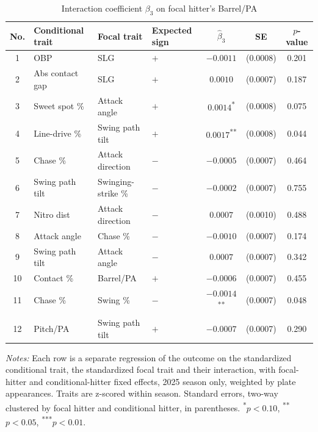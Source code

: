 \begin{table}[htbp]
\centering
\small
\caption{Interaction coefficient $\beta_3$ on focal hitter's Barrel/PA}
\label{tab:table1_barrel_2025}
\begin{tabular}{clllccc}
\toprule
No. & Conditional trait & Focal trait & Expected sign & $\hat\beta_3$ & SE & $p$-value \\
\midrule
1 & OBP & SLG & $+$ & $-0.0011$ & (0.0008) & 0.201 \\
2 & Abs contact gap & SLG & $+$ & $0.0010$ & (0.0007) & 0.187 \\
3 & Sweet spot \% & Attack angle & $+$ & $0.0014$\textsuperscript{*} & (0.0008) & 0.075 \\
4 & Line-drive \% & Swing path tilt & $+$ & $0.0017$\textsuperscript{**} & (0.0008) & 0.044 \\
5 & Chase \% & Attack direction & $-$ & $-0.0005$ & (0.0007) & 0.464 \\
6 & Swing path tilt & Swinging-strike \% & $-$ & $-0.0002$ & (0.0007) & 0.755 \\
7 & Nitro dist & Attack direction & $-$ & $0.0007$ & (0.0010) & 0.488 \\
8 & Attack angle & Chase \% & $-$ & $-0.0010$ & (0.0007) & 0.174 \\
9 & Swing path tilt & Attack angle & $-$ & $0.0007$ & (0.0007) & 0.342 \\
10 & Contact \% & Barrel/PA & $+$ & $-0.0006$ & (0.0007) & 0.455 \\
11 & Chase \% & Swing \% & $-$ & $-0.0014$\textsuperscript{**} & (0.0007) & 0.048 \\
12 & Pitch/PA & Swing path tilt & $+$ & $-0.0007$ & (0.0007) & 0.290 \\
\bottomrule
\end{tabular}
\par\smallskip\parbox{0.95\textwidth}{\footnotesize \textit{Notes:} Each row is a separate regression of the outcome on the standardized conditional trait, the standardized focal trait and their interaction, with focal-hitter and conditional-hitter fixed effects, 2025 season only, weighted by plate appearances. Traits are z-scored within season. Standard errors, two-way clustered by focal hitter and conditional hitter, in parentheses. \textsuperscript{*}$p<0.10$, \textsuperscript{**}$p<0.05$, \textsuperscript{***}$p<0.01$.}
\end{table}
